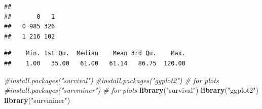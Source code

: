\documentclass[
  10pt,
]{book}
\newenvironment{Shaded}{\begin{snugshade}}{\end{snugshade}}
\newcommand{\CommentTok}[1]{\textcolor[rgb]{0.56,0.35,0.01}{\textit{#1}}}
\newcommand{\DecValTok}[1]{\textcolor[rgb]{0.00,0.00,0.81}{#1}}
\newcommand{\KeywordTok}[1]{\textcolor[rgb]{0.13,0.29,0.53}{\textbf{#1}}}
\newcommand{\NormalTok}[1]{#1}
\newcommand{\OperatorTok}[1]{\textcolor[rgb]{0.81,0.36,0.00}{\textbf{#1}}}
\newcommand{\StringTok}[1]{\textcolor[rgb]{0.31,0.60,0.02}{#1}}
\begin{document}
\begin{Shaded}
\end{Shaded}

\begin{verbatim}
##    
##       0   1
##   0 985 326
##   1 216 102
\end{verbatim}

\begin{Shaded}
\end{Shaded}

\begin{verbatim}
##    Min. 1st Qu.  Median    Mean 3rd Qu.    Max. 
##    1.00   35.00   61.00   61.14   86.75  120.00
\end{verbatim}

\begin{Shaded}
\begin{Highlighting}[]
\CommentTok{#install.packages("survival")}
\CommentTok{#install.packages("ggplot2") # for plots}
\CommentTok{#install.packages("survminer") # for plots}
\KeywordTok{library}\NormalTok{(}\StringTok{"survival"}\NormalTok{)}
\KeywordTok{library}\NormalTok{(}\StringTok{"ggplot2"}\NormalTok{)}
\KeywordTok{library}\NormalTok{(}\StringTok{"survminer"}\NormalTok{)}
\end{Highlighting}
\end{Shaded}
\end{document}
